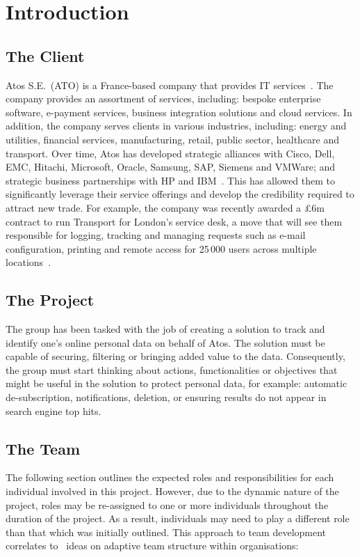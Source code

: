 \section{Introduction}

\subsection{The Client}

Atos S.E.~(ATO) is a France-based company that provides IT services~\parencite{web:reuters}. The company provides an assortment of services, including: bespoke enterprise software, e-payment services, business integration solutions and cloud services. In addition, the company serves clients in various industries, including: energy and utilities, financial services, manufacturing, retail, public sector, healthcare and transport. Over time, Atos has developed strategic alliances with Cisco, Dell, EMC, Hitachi, Microsoft, Oracle, Samsung, SAP, Siemens and VMWare; and strategic business partnerships with HP and IBM~\parencite{web:bloomberg}. This has allowed them to significantly leverage their service offerings and develop the credibility required to attract new trade. For example, the company was recently awarded a \pounds 6m contract to run Transport for London's service desk, a move that will see them responsible for logging, tracking and managing requests such as e-mail configuration, printing and remote access for 25\,000 users across multiple locations~\parencite{web:jee}.

\subsection{The Project}

The group has been tasked with the job of creating a solution to track and identify one’s online personal data on behalf of Atos. The solution must be capable of securing, filtering or bringing added value to the data. Consequently, the group must start thinking about actions, functionalities or objectives that might be useful in the solution to protect personal data, for example: automatic de-subscription, notifications, deletion, or ensuring results do not appear in search engine top hits.

\subsection{The Team}

The following section outlines the expected roles and responsibilities for each individual involved in this project. However, due to the dynamic nature of the project, roles may be re-assigned to one or more individuals throughout the duration of the project. As a result, individuals may need to play a different role than that which was initially outlined. This approach to team development correlates to~\cite{book:xteams} ideas on adaptive team structure within organisations:


